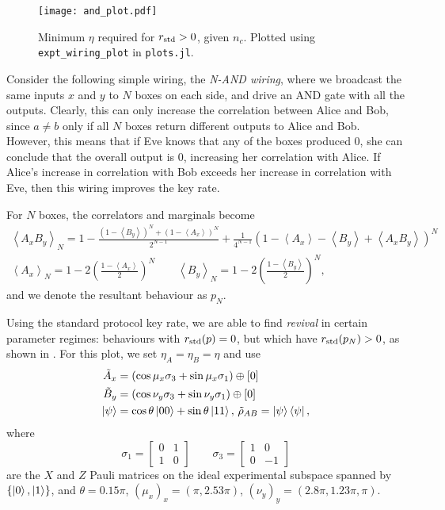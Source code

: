 \documentclass[10pt, a4paper]{article}
\numberwithin{equation}{section} %
\theoremstyle{definition}
\theoremstyle{plain}
\newcommand{\?}{\mathrel{?}} %
\newcommand{\angleb}[1]{\left\langle #1 \right\rangle} %
\newcommand{\std}{\rm std}
\begin{document}
              \begin{figure}
                \centering
                \texttt{[image: and\_plot.pdf]}
                \caption{\label{fig:exptplt} Minimum \(\eta\) required for \(r_{\std} > 0\), given \(n_c\). Plotted using \texttt{expt\_wiring\_plot} in \texttt{plots.jl}.}
              \end{figure}

              Consider the following simple wiring, the \emph{N-AND wiring}, where we broadcast the same inputs \(x\) and \(y\) to \(N\) boxes on each side, and drive an AND gate with all the outputs. Clearly, this can only increase the correlation between Alice and Bob, since \(a \neq b\) only if all \(N\) boxes return different outputs to Alice and Bob. However, this means that if Eve knows that any of the boxes produced 0, she can conclude that the overall output is 0, increasing her correlation with Alice. If Alice's increase in correlation with Bob exceeds her increase in correlation with Eve, then this wiring improves the key rate.

              For \(N\) boxes, the correlators and marginals become
              \begin{gather}
                \angleb{A_x B_y}_{N} = 1 - \frac{{(1-\angleb{B_y})}^N + {(1-\angleb{A_x})}^N}{2^{N-1}} + \frac{1}{4^{N-1}} {(1-\angleb{A_x} - \angleb{B_y} + \angleb{A_x B_y})}^{N} \\
                \angleb{A_x}_{N} = 1 - 2 {\left(\frac{1-\angleb{A_x}}{2}\right)}^N \qquad \angleb{B_y}_{N} = 1 - 2 {\left(\frac{1-\angleb{B_y}}{2}\right)}^N,
              \end{gather}
              and we denote the resultant behaviour as \(p_N\).

              Using the standard protocol key rate, we are able to find \emph{revival} in certain parameter regimes: behaviours with \(r_{\std}(p) = 0\), but which have \(r_{\std}(p_N) > 0\), as shown in . For this plot, we set \(\eta_A = \eta_B = \eta\) and use
              \begin{align*}
                \tilde{A}_x &= \left(\cos\mu_x \sigma_3 + \sin\mu_x \sigma_1\right) \oplus [0] \\
                \tilde{B}_y &= \left(\cos\nu_y \sigma_3 + \sin\nu_y \sigma_1\right) \oplus [0] \\
                \ket{\psi} &= \cos\theta \ket{00} + \sin\theta \ket{11},\,\tilde{\rho}_{AB} = \ket{\psi}\bra{\psi},
              \end{align*}
              where
              \[ \sigma_1 = \begin{bmatrix} 0 & 1 \\ 1 &  0 \end{bmatrix} \qquad \sigma_3 = \begin{bmatrix} 1 & 0 \\ 0 & -1 \end{bmatrix} \]
              are the \(X\) and \(Z\) Pauli matrices on the ideal experimental subspace spanned by \(\{\ket{0}, \ket{1}\}\), and \(\theta=0.15\pi\), \({(\mu_x)}_x = (\pi, 2.53\pi)\), \({(\nu_y)}_y = (2.8\pi, 1.23\pi, \pi)\).
\end{document}
